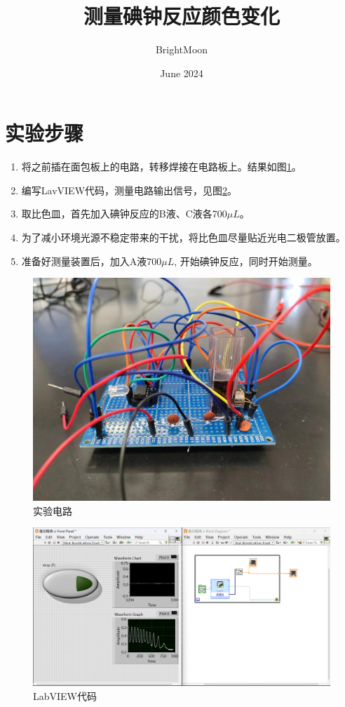 \documentclass[UTF8]{ctexart}
\title{测量碘钟反应颜色变化}
\author{BrightMoon}
\date{June 2024}
\begin{document}
\maketitle

\section{实验步骤}
\begin{enumerate}
    \item 将之前插在面包板上的电路，转移焊接在电路板上。结果如图\ref{实验电路}。
    \item 编写LavVIEW代码，测量电路输出信号，见图\ref{LabVIEW代码}。
    \item 取比色皿，首先加入碘钟反应的B液、C液各700$\mu L$。
    \item 为了减小环境光源不稳定带来的干扰，将比色皿尽量贴近光电二极管放置。
    \item 准备好测量装置后，加入A液700$\mu L$, 开始碘钟反应，同时开始测量。
\end{enumerate}

\begin{figure}
    \centering
    \includegraphics[width=0.5\linewidth]{实验电路.jpg}
    \caption{实验电路}
    \label{实验电路}
\end{figure}
\begin{figure}
    \centering
    \includegraphics[width=0.75\linewidth]{检测结果显示程序.png}
    \caption{LabVIEW代码}
    \label{LabVIEW代码}
\end{figure}
\end{document}
